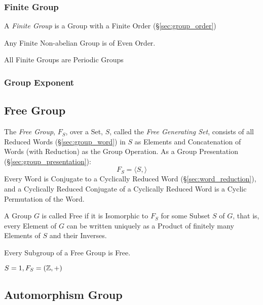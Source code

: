 \subsubsection{Finite Group}\label{sec:finite_group}

A \emph{Finite Group} is a Group with a Finite Order (\S\ref{sec:group_order})

Any Finite Non-abelian Group is of Even Order.

All Finite Groups are Periodic Groups



\subsubsection{Group Exponent}\label{sec:group_exponent}



\subsection{Free Group}\label{sec:free_group}

The \emph{Free Group}, $F_S$, over a Set, $S$, called the \emph{Free
  Generating Set}, consists of all Reduced Words
(\S\ref{sec:group_word}) in $S$ as Elements and Concatenation of Words
(with Reduction) as the Group Operation. As a Group Presentation
(\S\ref{sec:group_presentation}):
\[
    F_S = \langle S, \rangle
\]
Every Word is Conjugate to a Cyclically Reduced Word
(\S\ref{sec:word_reduction}), and a Cyclically Reduced Conjugate of a
Cyclically Reduced Word is a Cyclic Permutation of the Word.

A Group $G$ is called Free if it is Isomorphic to $F_S$ for some
Subset $S$ of $G$, that is, every Element of $G$ can be written
uniquely as a Product of finitely many Elements of $S$ and their
Inverses.

Every Subgroup of a Free Group is Free. \cite{hatcher02}

$S = {1}, F_S = (\mathbb{Z},+)$



\subsection{Automorphism Group}\label{sec:automorphism_group}

